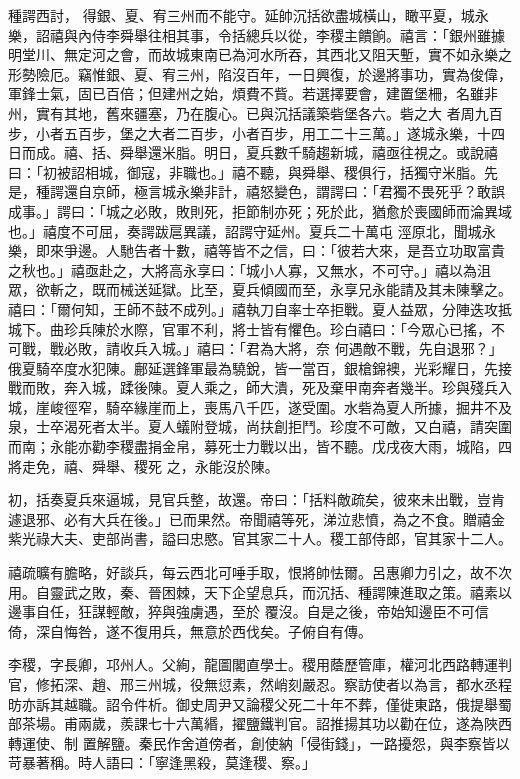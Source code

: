 \begin{pinyinscope}
 種諤西討，
 得銀、夏、宥三州而不能守。延帥沉括欲盡城橫山，瞰平夏，城永樂，詔禧與內侍李舜舉往相其事，令括總兵以從，李稷主饋餉。禧言：「銀州雖據明堂川、無定河之會，而故城東南已為河水所吞，其西北又阻天塹，實不如永樂之形勢險厄。竊惟銀、夏、宥三州，陷沒百年，一日興復，於邊將事功，實為俊偉，軍鋒士氣，固已百倍；但建州之始，煩費不貲。若選擇要會，建置堡柵，名雖非州，實有其地，舊來疆塞，乃在腹心。已與沉括議築砦堡各六。砦之大
 者周九百步，小者五百步，堡之大者二百步，小者百步，用工二十三萬。」遂城永樂，十四日而成。禧、括、舜舉還米脂。明日，夏兵數千騎趨新城，禧亟往視之。或說禧曰：「初被詔相城，御寇，非職也。」禧不聽，與舜舉、稷俱行，括獨守米脂。先是，種諤還自京師，極言城永樂非計，禧怒變色，謂諤曰：「君獨不畏死乎？敢誤成事。」諤曰：「城之必敗，敗則死，拒節制亦死；死於此，猶愈於喪國師而淪異域也。」禧度不可屈，奏諤跋扈異議，詔諤守延州。夏兵二十萬屯
 涇原北，聞城永樂，即來爭邊。人馳告者十數，禧等皆不之信，曰：「彼若大來，是吾立功取富貴之秋也。」禧亟赴之，大將高永享曰：「城小人寡，又無水，不可守。」禧以為沮眾，欲斬之，既而械送延獄。比至，夏兵傾國而至，永享兄永能請及其未陳擊之。禧曰：「爾何知，王師不鼓不成列。」禧執刀自率士卒拒戰。夏人益眾，分陣迭攻抵城下。曲珍兵陳於水際，官軍不利，將士皆有懼色。珍白禧曰：「今眾心已搖，不可戰，戰必敗，請收兵入城。」禧曰：「君為大將，奈
 何遇敵不戰，先自退邪？」俄夏騎卒度水犯陳。鄜延選鋒軍最為驍銳，皆一當百，銀槍錦襖，光彩耀日，先接戰而敗，奔入城，蹂後陳。夏人乘之，師大潰，死及棄甲南奔者幾半。珍與殘兵入城，崖峻徑窄，騎卒緣崖而上，喪馬八千匹，遂受圍。水砦為夏人所據，掘井不及泉，士卒渴死者太半。夏人蟻附登城，尚扶創拒鬥。珍度不可敵，又白禧，請突圍而南；永能亦勸李稷盡捐金帛，募死士力戰以出，皆不聽。戊戌夜大雨，城陷，四將走免，禧、舜舉、稷死
 之，永能沒於陳。



 初，括奏夏兵來逼城，見官兵整，故還。帝曰：「括料敵疏矣，彼來未出戰，豈肯遽退邪、必有大兵在後。」已而果然。帝聞禧等死，涕泣悲憤，為之不食。贈禧金紫光祿大夫、吏部尚書，謚曰忠愍。官其家二十人。稷工部侍郎，官其家十二人。



 禧疏曠有膽略，好談兵，每云西北可唾手取，恨將帥怯爾。呂惠卿力引之，故不次用。自靈武之敗，秦、晉困棘，天下企望息兵，而沉括、種諤陳進取之策。禧素以邊事自任，狂謀輕敵，猝與強虜遇，至於
 覆沒。自是之後，帝始知邊臣不可信倚，深自悔咎，遂不復用兵，無意於西伐矣。子俯自有傳。



 李稷，字長卿，邛州人。父絢，龍圖閣直學士。稷用蔭歷管庫，權河北西路轉運判官，修拓深、趙、邢三州城，役無愆素，然峭刻嚴忍。察訪使者以為言，都水丞程昉亦訴其越職。詔令件析。御史周尹又論稷父死二十年不葬，僅徙東路，俄提舉蜀部茶場。甫兩歲，羨課七十六萬緡，擢鹽鐵判官。詔推揚其功以勸在位，遂為陜西轉運使、制
 置解鹽。秦民作舍道傍者，創使納「侵街錢」，一路擾怨，與李察皆以苛暴著稱。時人語曰：「寧逢黑殺，莫逢稷、察。」




\end{pinyinscope}
